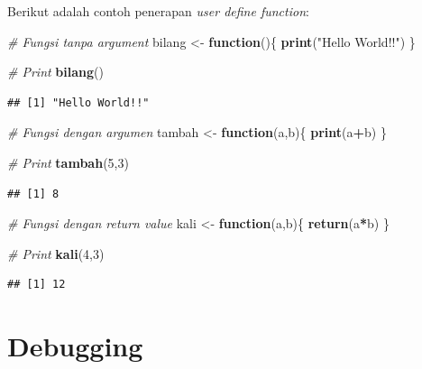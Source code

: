 \documentclass[
]{book}
\newenvironment{Shaded}{\begin{snugshade}}{\end{snugshade}}
\newcommand{\CommentTok}[1]{\textcolor[rgb]{0.56,0.35,0.01}{\textit{#1}}}
\newcommand{\ControlFlowTok}[1]{\textcolor[rgb]{0.13,0.29,0.53}{\textbf{#1}}}
\newcommand{\DecValTok}[1]{\textcolor[rgb]{0.00,0.00,0.81}{#1}}
\newcommand{\FunctionTok}[1]{\textcolor[rgb]{0.13,0.29,0.53}{\textbf{#1}}}
\newcommand{\NormalTok}[1]{#1}
\newcommand{\OtherTok}[1]{\textcolor[rgb]{0.56,0.35,0.01}{#1}}
\newcommand{\SpecialCharTok}[1]{\textcolor[rgb]{0.81,0.36,0.00}{\textbf{#1}}}
\newcommand{\StringTok}[1]{\textcolor[rgb]{0.31,0.60,0.02}{#1}}
\theoremstyle{definition}
\theoremstyle{definition}
\theoremstyle{definition}
\theoremstyle{definition}
\theoremstyle{remark}
\begin{document}
Berikut adalah contoh penerapan \emph{user define function}:

\begin{Shaded}
\begin{Highlighting}[]
\CommentTok{\# Fungsi tanpa argument}
\NormalTok{bilang }\OtherTok{\textless{}{-}} \ControlFlowTok{function}\NormalTok{()\{}
  \FunctionTok{print}\NormalTok{(}\StringTok{"Hello World!!"}\NormalTok{)}
\NormalTok{\}}

\CommentTok{\# Print}
\FunctionTok{bilang}\NormalTok{()}
\end{Highlighting}
\end{Shaded}

\begin{verbatim}
## [1] "Hello World!!"
\end{verbatim}

\begin{Shaded}
\begin{Highlighting}[]
\CommentTok{\# Fungsi dengan argumen}
\NormalTok{tambah }\OtherTok{\textless{}{-}} \ControlFlowTok{function}\NormalTok{(a,b)\{}
  \FunctionTok{print}\NormalTok{(a}\SpecialCharTok{+}\NormalTok{b)}
\NormalTok{\}}

\CommentTok{\# Print}
\FunctionTok{tambah}\NormalTok{(}\DecValTok{5}\NormalTok{,}\DecValTok{3}\NormalTok{)}
\end{Highlighting}
\end{Shaded}

\begin{verbatim}
## [1] 8
\end{verbatim}

\begin{Shaded}
\begin{Highlighting}[]
\CommentTok{\# Fungsi dengan return value}
\NormalTok{kali }\OtherTok{\textless{}{-}} \ControlFlowTok{function}\NormalTok{(a,b)\{}
  \FunctionTok{return}\NormalTok{(a}\SpecialCharTok{*}\NormalTok{b)}
\NormalTok{\}}

\CommentTok{\# Print}
\FunctionTok{kali}\NormalTok{(}\DecValTok{4}\NormalTok{,}\DecValTok{3}\NormalTok{)}
\end{Highlighting}
\end{Shaded}

\begin{verbatim}
## [1] 12
\end{verbatim}

\hypertarget{debugging}{%
\section{Debugging}\label{debugging}}
\end{document}
